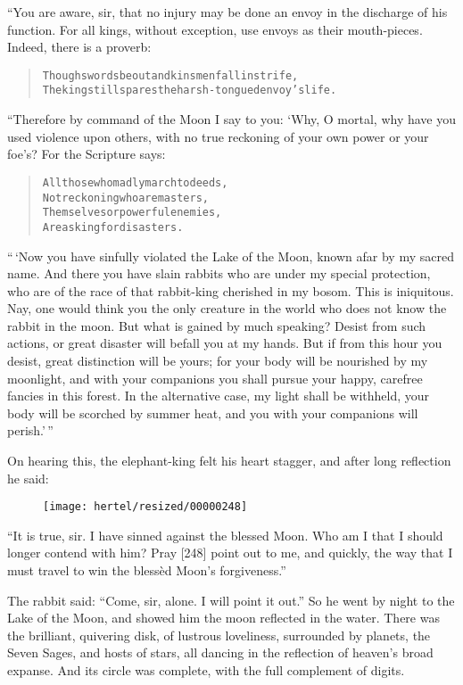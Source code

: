\documentclass[article, twoside, 10pt]{memoir}
\renewenvironment{verbatim}{%
\begin{quote}%
\vskip -10pt%
\begin{alltt}\normalfont\small}{\end{alltt}%
\end{quote}%
\vskip -10pt
} %
\begin{document}
“You are aware, sir, that no injury may be done an envoy in the
discharge of his function. For all kings, without exception, use
envoys as their mouth-pieces. Indeed, there is a proverb:

\begin{verbatim}
Though swords be out and kinsmen fall in strife,
The king still spares the harsh-tongued envoy's life.
\end{verbatim}
“Therefore by command of the Moon I say to you: ‘Why, O mortal, why
have you used violence upon others, with no true reckoning of your
own power or your foe's? For the Scripture says:

\begin{verbatim}
All those who madly march to deeds,
Not reckoning who are masters,
Themselves or powerful enemies,
Are asking for disasters.
\end{verbatim}
``\,`Now you have sinfully violated the Lake of the Moon, known afar by my sacred name. And there you have slain rabbits who are under my special protection, who are of the race of that rabbit-king cherished in my bosom. This is iniquitous. Nay, one would think you the only creature in the world who does not know the rabbit in the moon. But what is gained by much speaking? Desist from such actions, or great disaster will befall you at my hands. But if from this hour you desist, great distinction will be yours; for your body will be nourished by my moonlight, and with your companions you shall pursue your happy, carefree fancies in this forest. In the alternative case, my light shall be withheld, your body will be scorched by summer heat, and you with your companions will perish.'\,''

On hearing this, the elephant-king felt his heart stagger, and
after long reflection he said:
\begin{figure}[p]\texttt{[image: hertel/resized/00000248]}\end{figure}``It is true, sir. I have sinned against the blessed Moon. Who am I that I should longer contend with him? Pray [248] point out to me, and quickly, the way that I must travel to win the blessèd Moon's forgiveness.''

The rabbit said: ``Come, sir, alone. I will point it out.'' So he
went by night to the Lake of the Moon, and showed him the moon
reflected in the water. There was the brilliant, quivering disk, of
lustrous loveliness, surrounded by planets, the Seven Sages, and
hosts of stars, all dancing in the reflection of heaven's broad
expanse. And its circle was complete, with the full complement of
digits.
\end{document}
